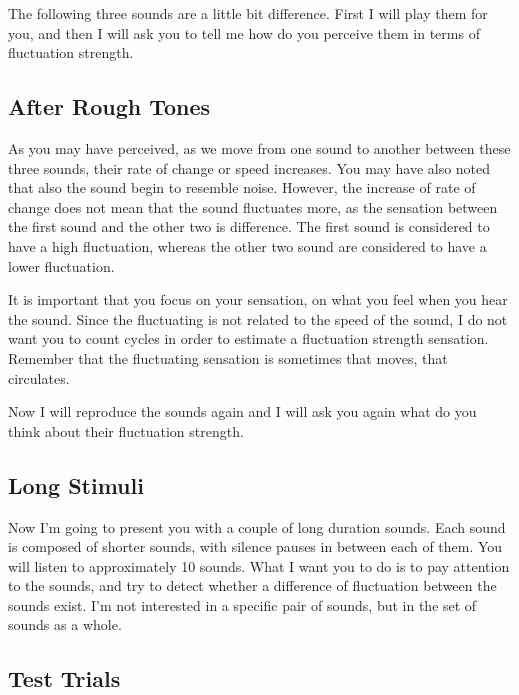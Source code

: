 \documentclass[a4paper]{article}
\begin{document}
The following three sounds are a little bit difference. First I will play them
for you, and then I will ask you to tell me how do you perceive them in terms
of fluctuation strength.


\subsection{After Rough Tones} %
\label{sub:after_rough_tones}

As you may have perceived, as we move from one sound to another between these
three sounds, their rate of change or speed increases. You may have also noted
that also the sound begin to resemble noise. However, the increase of rate of
change does not mean that the sound fluctuates more, as the sensation between
the first sound and the other two is difference. The first sound is considered
to have a high fluctuation, whereas the other two sound are considered to have
a lower fluctuation.

It is important that you focus on your sensation, on what you feel when you
hear the sound. Since the fluctuating is not related to the speed of the sound,
I do not want you to count cycles in order to estimate a fluctuation strength
sensation. Remember that the fluctuating sensation is sometimes that moves, that
circulates.

Now I will reproduce the sounds again and I will ask you again what do you think
about their fluctuation strength.


\subsection{Long Stimuli} %
\label{sub:long_stimuli}

Now I'm going to present you with a couple of long duration sounds. Each sound
is composed of shorter sounds, with silence pauses in between each of them. You
will listen to approximately 10 sounds. What I want you to do is to pay
attention to the sounds, and try to detect whether a difference of fluctuation
between the sounds exist. I'm not interested in a specific pair of sounds, but
in the set of sounds as a whole.


\subsection{Test Trials} %
\label{sub:test_trials}
\end{document}
